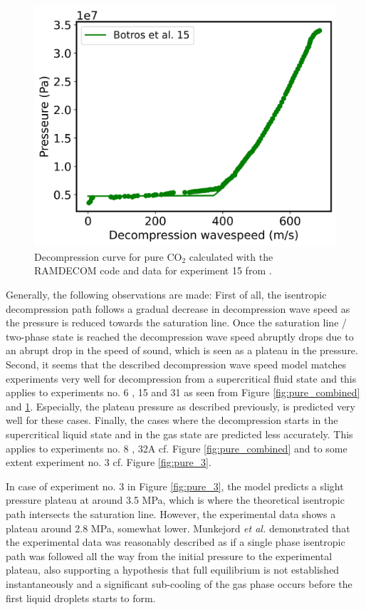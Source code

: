 \documentclass[a4paper, 10pt, twocolumn, twoside]{scrartcl}
\begin{document}
\begin{figure}[!ht]
	\centering
	\includegraphics[width=\columnwidth]{./Bilder/pure_3.png}
	\caption{Decompression curve for pure CO$_2$ calculated with the RAMDECOM code and data for experiment 15 from \cite{Botros_pure}.}
	\label{fig:pure_15}
\end{figure}

Generally, the following observations are made: First of all, the isentropic decompression path follows a gradual decrease in decompression wave speed as the pressure is reduced towards the saturation line. Once the saturation line / two-phase state is reached the decompression wave speed abruptly drops due to an abrupt drop in the speed of sound, which is seen as a plateau in the pressure.  
Second, it seems that the described decompression wave speed model matches experiments very well for decompression from a supercritical fluid state and this applies to experiments no. 6 \cite{MUNKEJORD2020118560}, 15 \cite{Botros_pure} and 31 \cite{Botros_pure} as seen from Figure \ref{fig:pure_combined} and \ref{fig:pure_15}. Especially, the plateau pressure as described previously, is predicted very well for these cases. Finally, the cases where the decompression starts in the supercritical liquid state and in the gas state are predicted less accurately. This applies to experiments no. 8 \cite{MUNKEJORD2020118560}, 32A \cite{Botros_pure} cf. Figure \ref{fig:pure_combined} and to some extent experiment no. 3 \cite{MUNKEJORD2020118560} cf. Figure \ref{fig:pure_3}. 

In case of experiment no. 3 in Figure \ref{fig:pure_3}, the model predicts a slight pressure plateau  at around 3.5 MPa, which is where the theoretical isentropic path intersects the saturation line. However, the experimental data shows a plateau around 2.8 MPa, somewhat lower. Munkejord \emph{et al.} \cite{MUNKEJORD2020118560} demonstrated that the experimental data was reasonably described as if a single phase isentropic path was followed all the way from the initial pressure to the experimental plateau, also supporting a hypothesis that full equilibrium is not established instantaneously and a significant sub-cooling of the gas phase occurs before the first liquid droplets starts to form.  
\end{document}

